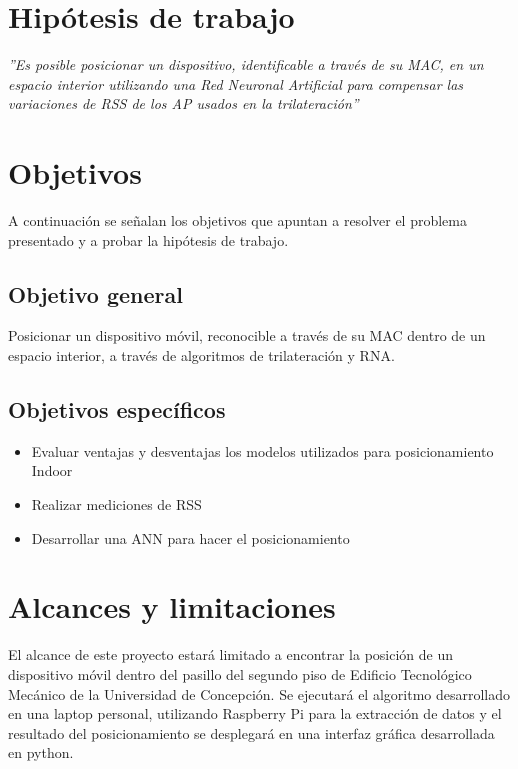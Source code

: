                 \clearpage 
\section{Hipótesis de trabajo}
\begin{center}
\textit{''Es posible posicionar un dispositivo, identificable a través de su MAC, en un espacio interior utilizando una Red Neuronal Artificial para compensar las variaciones de RSS de los \ac{AP} usados en la trilateración''}
\end{center}

\section{Objetivos}
A continuación se señalan los objetivos que apuntan a resolver el problema presentado y a probar la hipótesis de trabajo.

\subsection{Objetivo general}
Posicionar un dispositivo móvil, reconocible a través de su \ac{MAC} dentro de un espacio interior, a través de algoritmos de trilateración y \ac{RNA}.

\subsection{Objetivos específicos}
\begin{itemize}[label={\checkmark}]
\item{Evaluar ventajas y desventajas los modelos utilizados para posicionamiento Indoor}
\item{Realizar mediciones de RSS}
\item{Desarrollar una ANN para hacer el posicionamiento}
\end{itemize}

\section{Alcances y limitaciones}
El alcance de este proyecto estará limitado a encontrar la posición de un dispositivo móvil dentro del pasillo del segundo piso de Edificio Tecnológico Mecánico de la Universidad de Concepción. Se ejecutará el algoritmo desarrollado en una laptop personal, utilizando Raspberry Pi para la extracción de datos y el resultado del posicionamiento se desplegará en una interfaz gráfica desarrollada en python.

